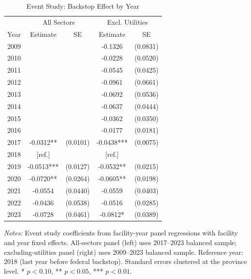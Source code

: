 \begin{table}[htbp]
\centering
\caption{Event Study: Backstop Effect by Year}
\label{tab:eventstudy}
\begin{tabular}{lcccc}
\hline\hline
 & \multicolumn{2}{c}{All Sectors} & \multicolumn{2}{c}{Excl. Utilities} \\
Year & Estimate & SE & Estimate & SE \\
\hline
2009 &  &  & -0.1326 & (0.0831) \\
2010 &  &  & -0.0228 & (0.0520) \\
2011 &  &  & -0.0545 & (0.0425) \\
2012 &  &  & -0.0961 & (0.0661) \\
2013 &  &  & -0.0692 & (0.0536) \\
2014 &  &  & -0.0637 & (0.0444) \\
2015 &  &  & -0.0362 & (0.0350) \\
2016 &  &  & -0.0177 & (0.0181) \\
2017 & -0.0312** & (0.0101) & -0.0438*** & (0.0075) \\
2018 & [ref.] & & [ref.] & \\
\hline
2019 & -0.0513*** & (0.0127) & -0.0532** & (0.0215) \\
2020 & -0.0720** & (0.0264) & -0.0605** & (0.0198) \\
2021 & -0.0554 & (0.0440) & -0.0559 & (0.0403) \\
2022 & -0.0436 & (0.0538) & -0.0516 & (0.0285) \\
2023 & -0.0728 & (0.0461) & -0.0812* & (0.0389) \\
\hline\hline
\end{tabular}
\begin{tablenotes}
\small
\item \textit{Notes:} Event study coefficients from facility-year panel regressions with facility and year fixed effects. All-sectors panel (left) uses 2017--2023 balanced sample; excluding-utilities panel (right) uses 2009--2023 balanced sample. Reference year: 2018 (last year before federal backstop). Standard errors clustered at the province level. * $p<0.10$, ** $p<0.05$, *** $p<0.01$.
\end{tablenotes}
\end{table}
